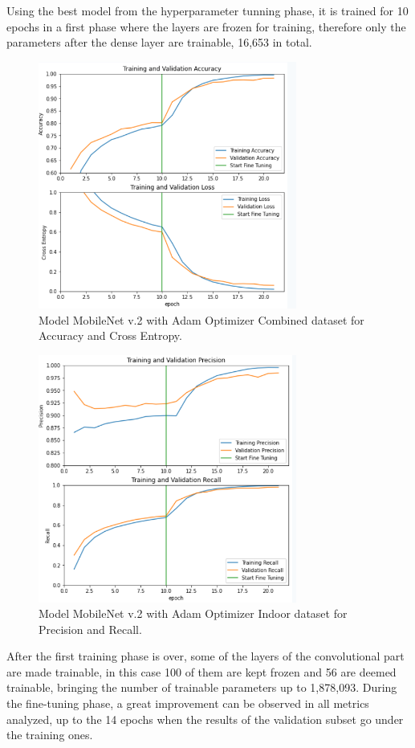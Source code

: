 \documentclass[conference]{IEEEtran}
\begin{document}
Using the best model from the hyperparameter tunning phase, it is trained for 10 epochs in a first phase where the layers are frozen for training, therefore only the parameters after the dense layer are trainable, 16,653 in total.\
\begin{figure}[htbp]
\centerline{\includegraphics[width=8.5cm]{ModelCombineAccCEntropy.png}}
\caption{Model MobileNet v.2 with Adam Optimizer Combined dataset for Accuracy and Cross Entropy.}
\label{fig}
\end{figure}

\begin{figure}[htbp]
\centerline{\includegraphics[width=8.5cm]{ModelCombinePrecisionRecall.png}}
\caption{Model MobileNet v.2 with Adam Optimizer Indoor dataset for Precision and Recall.}
\label{fig}
\end{figure}

After the first training phase is over, some of the layers of the convolutional part are made trainable, in this case 100 of them are kept frozen and 56 are deemed trainable, bringing the number of trainable parameters up to 1,878,093. During the fine-tuning phase, a great improvement can be observed in all metrics analyzed, up to the 14 epochs when the results of the validation subset go under the training ones. 
\end{document}
